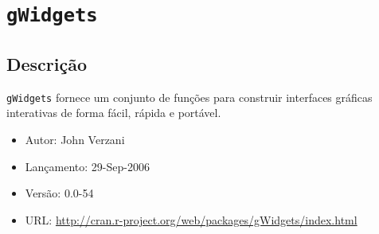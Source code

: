 \section{\texttt{gWidgets}}


\subsection{Descrição}

\begin{frame}

  \texttt{gWidgets} fornece um conjunto de funções para construir
  interfaces gráficas interativas de forma fácil, rápida e portável.
  \vspace{2em}

  \begin{itemize}
  \item Autor: John Verzani
  \item Lançamento: 29-Sep-2006
  \item Versão: 0.0-54
  \item URL:
    \url{http://cran.r-project.org/web/packages/gWidgets/index.html}
  \end{itemize}

\end{frame}

\begin{center}
\end{center}

